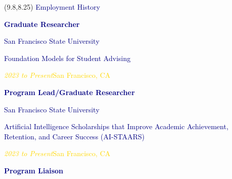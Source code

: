 \documentclass[hidelinks, 10pt]{article}
\begin{document}
\begin{textblock}{4}(9.8,8.25)
    \setlength{\parindent}{0cm}
    \large{\textcolor{navy}{Employment History}}

    \vspace{2mm}

    \footnotesize\textcolor{navy}{\scriptsize\textbf{Graduate Researcher}}

    \vspace{0.5mm}

    \footnotesize\textcolor{navy}{\scriptsize San Francisco State University}

    \vspace{0.5mm}

    \scriptsize\textcolor{navy}{\scriptsize Foundation Models for Student Advising}

    \vspace{0.5mm}

    \scriptsize\textcolor{gold}{\scriptsize\emph{2023 to Present}\hfill San
        Francisco, CA}

    \vspace{2mm}

    \footnotesize\textcolor{navy}{\scriptsize\textbf{Program Lead/Graduate Researcher}}

    \vspace{0.5mm}

    \footnotesize\textcolor{navy}{\scriptsize San Francisco State University}

    \vspace{0.5mm}

    \scriptsize\textcolor{navy}{\scriptsize Artificial Intelligence Scholarships that Improve Academic Achievement, Retention, and Career Success (AI-STAARS)}

    \vspace{0.5mm}

    \scriptsize\textcolor{gold}{\scriptsize\emph{2023 to Present}\hfill San
        Francisco, CA}

    \vspace{2mm}

    \footnotesize\textcolor{navy}{\scriptsize\textbf{Program Liaison}}

    \vspace{0.5mm}


\end{textblock}
\end{document}
